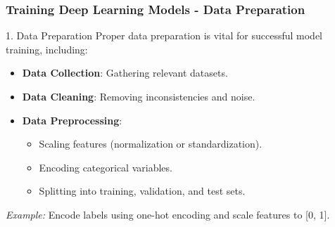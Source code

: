 \documentclass[aspectratio=169]{beamer}
\begin{document}
\begin{frame}[fragile]
    \frametitle{Training Deep Learning Models - Data Preparation}
    \begin{block}{1. Data Preparation}
        Proper data preparation is vital for successful model training, including:
        \begin{itemize}
            \item \textbf{Data Collection}: Gathering relevant datasets.
            \item \textbf{Data Cleaning}: Removing inconsistencies and noise.
            \item \textbf{Data Preprocessing}: 
                \begin{itemize}
                    \item Scaling features (normalization or standardization).
                    \item Encoding categorical variables.
                    \item Splitting into training, validation, and test sets.
                \end{itemize}
        \end{itemize}
        \textit{Example:} Encode labels using one-hot encoding and scale features to [0, 1].
    \end{block}
\end{frame}
\end{document}
